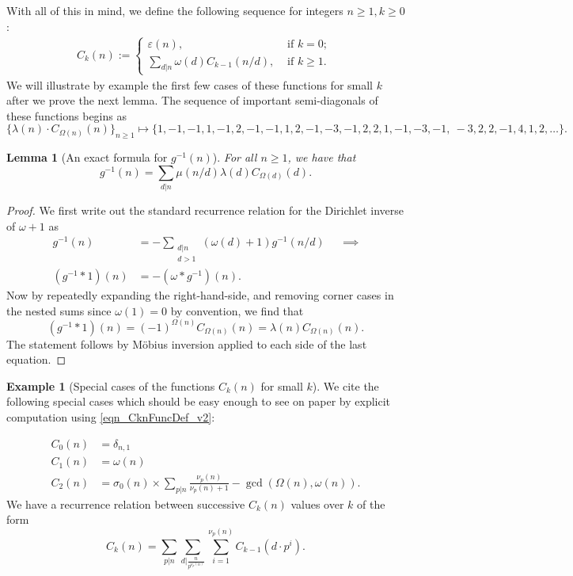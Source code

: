 \documentclass[11pt,reqno,a4letter]{article}
\numberwithin{figure}{section}
\numberwithin{table}{section}
\newcommand{\seqnum}[1]{\href{http://oeis.org/#1}{\color{ProcessBlue}{\underline{#1}}}}
\theoremstyle{plain}
\newtheorem{lemma}[theorem]{Lemma}
\numberwithin{theorem}{section}
\theoremstyle{definition}
\newtheorem{example}[theorem]{Example}
\newcommand{\NBRef}[1]{}
\begin{document}
With all of this in mind, we define the following sequence for integers $n \geq 1, k \geq 0$: 
\begin{align} 
\label{eqn_CknFuncDef_v2} 
C_k(n) := \begin{cases} 
     \varepsilon(n), & \text{ if $k = 0$; } \\ 
     \sum\limits_{d|n} \omega(d) C_{k-1}(n/d), & \text{ if $k \geq 1$. } 
     \end{cases} 
\end{align} 
We will illustrate by example the first few cases of these functions for small $k$ after we prove 
the next lemma. 
The sequence of important semi-diagonals of these functions begins as 
\cite[\seqnum{A008480}]{OEIS} 
\[
\{\lambda(n) \cdot C_{\Omega(n)}(n) \}_{n \geq 1} \mapsto \{
     1, -1, -1, 1, -1, 2, -1, -1, 1, 2, -1, -3, -1, 2, 2, 1, -1, -3, -1, \
     -3, 2, 2, -1, 4, 1, 2, \ldots \}. 
\]

\begin{lemma}[An exact formula for $g^{-1}(n)$] 
\label{lemma_AnExactFormulaFor_gInvByMobiusInv_v1} 
For all $n \geq 1$, we have that 
\[
g^{-1}(n) = \sum_{d|n} \mu(n/d) \lambda(d) C_{\Omega(d)}(d). 
\]
\end{lemma}
\begin{proof} 
We first write out the standard recurrence relation for the Dirichlet inverse of 
$\omega+1$ as 
\begin{align*} 
g^{-1}(n) & = - \sum_{\substack{d|n \\ d>1}} (\omega(d) + 1) g^{-1}(n/d) && \implies \\ 
     (g^{-1} \ast 1)(n) & = -(\omega \ast g^{-1})(n). 
\end{align*} 
Now by repeatedly expanding the right-hand-side, and removing corner cases in the nested sums since 
$\omega(1) = 0$ by convention, we find that 
\[
(g^{-1} \ast 1)(n) = (-1)^{\Omega(n)} C_{\Omega(n)}(n) = \lambda(n) C_{\Omega(n)}(n). 
\]
The statement follows by M\"obius inversion applied to each side of the last equation. 
\end{proof}

\begin{example}[Special cases of the functions $C_k(n)$ for small $k$] 
\label{example_SpCase_Ckn} 
We cite the following special cases which should be easy enough to see on paper by 
explicit computation using \eqref{eqn_CknFuncDef_v2}: 
\NBRef{A07-2020-04-26} 
\begin{align*} 
C_0(n) & = \delta_{n,1} \\ 
C_1(n) & = \omega(n) \\ 
C_2(n) & = \sigma_0(n) \times \sum_{p|n} \frac{\nu_p(n)}{\nu_p(n)+1} - \gcd\left(\Omega(n), \omega(n)\right). 
\end{align*} 
We have a recurrence relation between successive $C_k(n)$ values over $k$ of the form 
\begin{equation}
\label{eqn_Ckn_recFormula_v1} 
C_k(n) = \sum_{p|n} \sum_{d\bigr\rvert\frac{n}{p^{\nu_p(n)}}} \sum_{i=1}^{\nu_p(n)} C_{k-1}\left(d \cdot p^i\right). 
\end{equation}
\end{example} 
\end{document}
